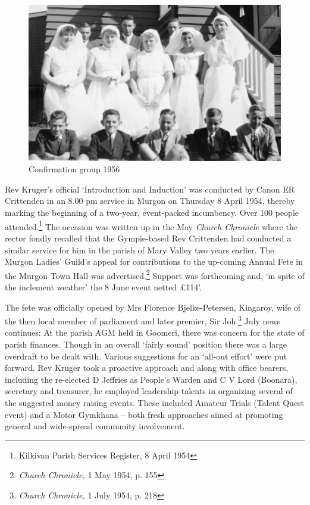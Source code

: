 \begin{figure}[!htb]
\begin{center}
\includegraphics[width=1.\textwidth,center]{../images/confirmation1956.jpg}
\caption{Confirmation group 1956}
\end{center}
\end{figure}




Rev Kruger's official `Introduction and Induction' was conducted by Canon ER Crittenden in an 8.00 pm service in Murgon on Thursday 8 April 1954, thereby marking the beginning of a two-year, event-packed incumbency. Over 100 people attended.\footnote{Kilkivan Parish Services Register, 8 April 1954} The occasion was written up in the May \emph{Church Chronicle} where the rector fondly recalled that the Gympie-based Rev Crittenden had conducted a similar service for him in the parish of Mary Valley two years earlier. The Murgon Ladies' Guild's appeal for contributions to the up-coming Annual Fete in the Murgon Town Hall was advertised.\footnote{\emph{Church Chronicle,} 1 May 1954, p. 155} Support was forthcoming and, `in spite of the inclement weather' the 8 June event netted \pounds114'.


The fete was officially opened by Mrs Florence Bjelke-Petersen, Kingaroy, wife of the then local member of parliament and later premier, Sir Joh.\footnote{\emph{Church Chronicle,} 1 July 1954, p. 218} July news continues: At the parish AGM held in Goomeri, there was concern for the state of parish finances. Though in an overall `fairly sound' position there was a large overdraft to be dealt with. Various suggestions for an `all-out effort' were put forward. Rev Kruger took a proactive approach and along with office bearers, including the re-elected D Jeffries as People's Warden and C V Lord (Boonara), secretary and treasurer, he employed leadership talents in organizing several of the suggested money raising events. These included Amateur Trials (Talent Quest event) and a Motor Gymkhana -- both fresh approaches aimed at promoting general and wide-spread community involvement.


